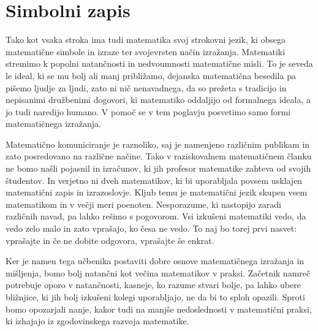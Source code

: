 \chapter{Simbolni zapis}

Tako kot vsaka stroka ima tudi matematika svoj strokovni jezik, ki obsega matematične
simbole in izraze ter svojevrsten način izražanja. Matematiki stremimo k popolni
natančnosti in nedvoumnosti matematične misli. To je seveda le ideal, ki se mu bolj ali
manj približamo, dejanska matematična besedila pa pišemo ljudje za ljudi, zato ni nič
nenavadnega, da so prežeta s tradicijo in nepisanimi družbenimi dogovori, ki matematiko
oddaljijo od formalnega ideala, a jo tudi naredijo humano.
%
V pomoč se v tem poglavju posvetimo samo formi matematičnega izražanja.

Matematično komuniciranje je raznoliko, saj je namenjeno različnim publikam in zato
posredovano na različne načine. Tako v raziskovalnem matematičnem članku ne bomo našli
pojasnil in izračunov, ki jih profesor matematike zahteva od svojih študentov. In verjetno
ni dveh matematikov, ki bi uporabljala povsem usklajen matematični zapis in izrazoslovje.
Kljub temu je matematični jezik skupen vsem matematikom in v večji meri poenoten.
Nesporazume, ki nastopijo zaradi različnih navad, pa lahko rešimo s pogovorom. Vsi
izkušeni matematiki vedo, da vedo zelo malo in zato vprašajo, ko česa ne vedo. To naj bo
torej prvi nasvet: vprašajte in če ne dobite odgovora, vprašajte še enkrat.

Ker je namen tega učbenika postaviti dobre osnove matematičnega izražanja in mišljenja,
bomo bolj natančni kot večina matematikov v praksi. Začetnik namreč potrebuje oporo v
natančnosti, kasneje, ko razume stvari bolje, pa lahko ubere bližnjice, ki jih bolj
izkušeni kolegi uporabljajo, ne da bi to sploh opazili. Sproti bomo opozarjali nanje,
kakor tudi na manjše nedoslednosti v matematični praksi, ki izhajajo iz zgodovinskega
razvoja matematike.





